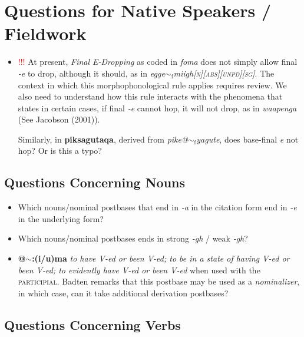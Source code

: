 \documentclass{article}
\begin{document}
\pagebreak

\section{Questions for Native Speakers / Fieldwork}

\begin{itemize}
\item \textcolor{red}{!!!} At present, \textit{Final E-Dropping} as coded in \textit{foma} does not simply allow final \textit{-e} to drop, although it should, as in \textit{egge$\sim_\text{f}$miigh\textsc{[n][abs][unpd][sg]}}. The context in which this morphophonological rule applies requires review. We also need to understand how this rule interacts with the phenomena that states in certain cases, if final \textit{-e} cannot hop, it will not drop, as in \textit{waapenga} (See Jacobson (2001)).

Similarly, in \textbf{piksagutaqa}, derived from \textit{pike@$\sim_\text{f}$yagute}, does base-final \textit{e} not hop? Or is this a typo?
\end{itemize}

\subsection{Questions Concerning Nouns}

\begin{itemize}
\item Which nouns/nominal postbases that end in \textit{-a} in the citation form end in \textit{-e} in the underlying form? 

\item Which nouns/nominal postbases ends in strong \textit{-gh} / weak \textit{-gh}? 

\item \textbf{@$\sim$:(i/u)ma} \textit{to have V-ed or been V-ed; to be in a state of having V-ed or been V-ed; to evidently have V-ed or been V-ed} when used with the \textsc{participial}. Badten remarks that this postbase may be used as a \textit{nominalizer}, in which case, can it take additional derivation postbases?
\end{itemize}

\subsection{Questions Concerning Verbs}
\end{document}
